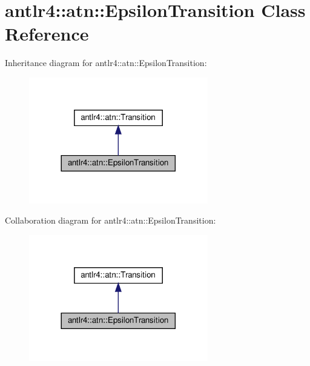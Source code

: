 \hypertarget{classantlr4_1_1atn_1_1EpsilonTransition}{}\section{antlr4\+:\+:atn\+:\+:Epsilon\+Transition Class Reference}
\label{classantlr4_1_1atn_1_1EpsilonTransition}


Inheritance diagram for antlr4\+:\+:atn\+:\+:Epsilon\+Transition\+:
\nopagebreak
\begin{figure}[H]
\begin{center}
\leavevmode
\includegraphics[width=221pt]{classantlr4_1_1atn_1_1EpsilonTransition__inherit__graph}
\end{center}
\end{figure}


Collaboration diagram for antlr4\+:\+:atn\+:\+:Epsilon\+Transition\+:
\nopagebreak
\begin{figure}[H]
\begin{center}
\leavevmode
\includegraphics[width=221pt]{classantlr4_1_1atn_1_1EpsilonTransition__coll__graph}
\end{center}
\end{figure}
